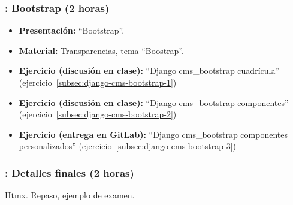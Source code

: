 \documentclass[a4paper,12pt]{article}
\begin{document}
\subsubsection{\martesL: Bootstrap (2 horas)}
\label{cal:martesL}

\begin{itemize}
\item \textbf{Presentación:} ``Bootstrap''.
 \item \textbf{Material:} Transparencias, tema ``Boostrap''.
   \item \textbf{Ejercicio (discusión en clase):} ``Django cms\_bootstrap cuadrícula'' (ejercicio~\ref{subsec:django-cms-bootstrap-1})
   \item \textbf{Ejercicio (discusión en clase):} ``Django cms\_bootstrap componentes'' (ejercicio~\ref{subsec:django-cms-bootstrap-2})
\item \textbf{Ejercicio (entrega en GitLab):} ``Django cms\_bootstrap componentes personalizados'' (ejercicio~\ref{subsec:django-cms-bootstrap-3})
\end{itemize}

\subsubsection{\martesM: Detalles finales (2 horas)}
\label{cal:martesM}

Htmx. Repaso, ejemplo de examen.





\end{document}
